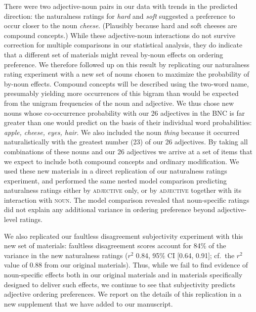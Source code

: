\documentclass[12pt]{article}
\begin{document}
There were two adjective-noun pairs in our data with trends in the predicted direction: the naturalness ratings for \emph{hard} and \emph{soft} suggested a preference to occur closer to the noun \emph{cheese}. (Plausibly because hard and soft cheeses are compound concepts.) While these adjective-noun interactions do not survive correction for multiple comparisons in our statistical analysis, they do indicate that a different set of materials might reveal by-noun effects on ordering preference. We therefore followed up on this result by replicating our naturalness rating experiment with a new set of nouns chosen to maximize the probability of by-noun effects.
Compound concepts will be described using the two-word name, presumably yielding more occurrences of this bigram than would be expected from the unigram frequencies of the noun and adjective.
We thus chose new nouns whose co-occurrence probability with our 26 adjectives in the BNC is far greater than one would predict on the basis of their individual word probabilities: \emph{apple, cheese, eyes, hair}. We also included the noun \emph{thing} because it occurred naturalistically with the greatest number (23) of our 26 adjectives.
By taking all combinations of these nouns and our 26 adjectives we arrive at a set of items that we expect to include both compound concepts and ordinary modification.
We used these new materials in a direct replication of our naturalness ratings experiment, and performed the same nested model comparison predicting naturalness ratings either by \textsc{adjective} only, or by \textsc{adjective} together with its interaction with \textsc{noun}. The model comparison revealed that noun-specific ratings did not explain any additional variance in ordering preference beyond adjective-level ratings.

We also replicated our faultless disagreement subjectivity experiment with this new set of materials: faultless disagreement scores account for 84\% of the variance in the new naturalness ratings ($r^2$ 0.84, 95\% CI [0.64,  0.91]; cf.~the $r^2$ value of 0.88 from our original materials). Thus, while we fail to find evidence of noun-specific effects both in our original materials and in materials specifically designed to deliver such effects, we continue to see that subjectivity predicts adjective ordering preferences. We report on the details of this replication in a new supplement that we have added to our manuscript.

\end{document}
